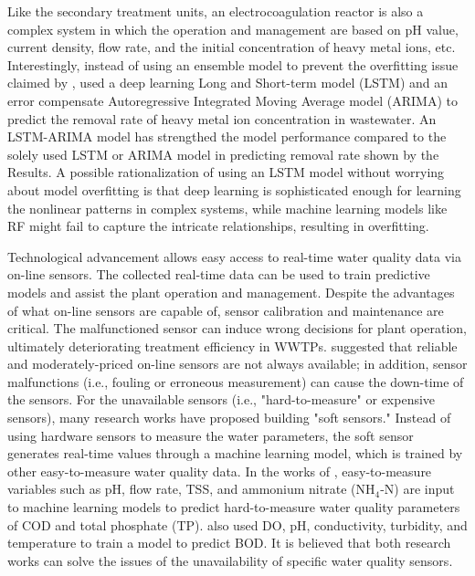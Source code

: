 Like the secondary treatment units, an electrocoagulation reactor is also a complex system in which the operation and management are based on pH value, current density, flow rate, and the initial concentration of heavy metal ions, etc. Interestingly, instead of using an ensemble model to prevent the overfitting issue claimed by \citet{zaghloulDevelopmentEnsembleMachine2021}, \citet{zhuPredictionMethodElectrocoagulation2021} used a deep learning Long and Short-term model (LSTM) and an error compensate Autoregressive Integrated Moving Average model (ARIMA) to predict the removal rate of heavy metal ion concentration in wastewater. An LSTM-ARIMA model has strengthed the model performance compared to the solely used LSTM or ARIMA model in predicting removal rate shown by the Results. A possible rationalization of using an LSTM model without worrying about model overfitting is that deep learning is sophisticated enough for learning the nonlinear patterns in complex systems, while machine learning models like RF might fail to capture the intricate relationships, resulting in overfitting.

Technological advancement allows easy access to real-time water quality data via on-line sensors. The collected real-time data can be used to train predictive models and assist the plant operation and management. Despite the advantages of what on-line sensors are capable of, sensor calibration and maintenance are critical. The malfunctioned sensor can induce wrong decisions for plant operation, ultimately deteriorating treatment efficiency in WWTPs. \citet{haimiShallWeUse2015} suggested that reliable and moderately-priced on-line sensors are not always available; in addition, sensor malfunctions (i.e., fouling or erroneous measurement) can cause the down-time of the sensors. For the unavailable sensors (i.e., "hard-to-measure" or expensive sensors), many research works have proposed building "soft sensors." Instead of using hardware sensors to measure the water parameters, the soft sensor generates real-time values through a machine learning model, which is trained by other easy-to-measure water quality data. In the works of \citet{wangExplicitInterpretableNonlinear2019}, easy-to-measure variables such as pH, flow rate, TSS, and ammonium nitrate (NH$_4$-N) are input to machine learning models to predict hard-to-measure water quality parameters of COD and total phosphate (TP). \citet{pattnaikMachineLearningBased2021} also used DO, pH, conductivity, turbidity, and temperature to train a model to predict BOD. It is believed that both research works can solve the issues of the unavailability of specific water quality sensors. 


